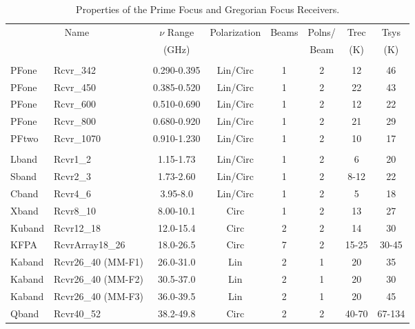 \begin{table}[!h]
\begin{center}
\caption[GBT receiver properties]
{Properties of the Prime Focus and Gregorian Focus Receivers.}
\label{table:gregrx}
\begin{tabular}{llcccccc}
\toprule
\multicolumn{2}{c}{Name} & $\nu$ Range & Polarization & Beams & Polns/& \gls{Trec} & \gls{Tsys} \\
   &                     & (GHz)       &              &       & Beam  &    (K)     &   (K)      \\
\midrule
\addlinespace
\multicolumn{8}{c}{--- Prime Focus Receivers ---}\\
\addlinespace
\gls{PFone} & Rcvr\_342 & 0.290-0.395 &	Lin/Circ &	1 &	2 &	12 &	46 \\
\gls{PFone} & Rcvr\_450 & 0.385-0.520 &	Lin/Circ &	1 &	2 &	22 &	43 \\
\gls{PFone} & Rcvr\_600 & 0.510-0.690 &	Lin/Circ &	1 &	2 &	12 &	22 \\
\gls{PFone} & Rcvr\_800 & 0.680-0.920 &	Lin/Circ &	1 &	2 &	21 &	29 \\
\gls{PFtwo} & Rcvr\_1070& 0.910-1.230 &	Lin/Circ &	1 &	2 &	10 &	17 \\
\addlinespace
\midrule
\addlinespace
\multicolumn{8}{c}{--- Gregorian Focus Receivers ---} \\
\addlinespace
\gls{Lband} & Rcvr1\_2           & 1.15-1.73 & Lin/Circ & 1 & 2 &      6 & 20 \\
\gls{Sband} & Rcvr2\_3           & 1.73-2.60 & Lin/Circ & 1 & 2 &   8-12 & 22 \\
\gls{Cband} & Rcvr4\_6           & 3.95-8.0  & Lin/Circ & 1 & 2 &     5  & 18 \\
\gls{Xband} & Rcvr8\_10          & 8.00-10.1 & Circ     & 1 & 2 &     13 & 27 \\
\gls{Kuband}& Rcvr12\_18         & 12.0-15.4 & Circ     & 2 & 2 &     14 & 30 \\ %
\gls{KFPA}  & RcvrArray18\_26    & 18.0-26.5 & Circ     & 7 & 2 &  15-25 & 30-45 \\
\gls{Kaband}& Rcvr26\_40 (MM-F1) & 26.0-31.0 & Lin      & 2 & 1 &     20 & 35 \\
\gls{Kaband}& Rcvr26\_40 (MM-F2) & 30.5-37.0 & Lin      & 2 & 1 &     20 & 30 \\
\gls{Kaband}& Rcvr26\_40 (MM-F3) & 36.0-39.5 & Lin      & 2 & 1 &     20 & 45 \\
\gls{Qband} & Rcvr40\_52         & 38.2-49.8 & Circ     & 2 & 2 &  40-70 & 67-134 \\ %

\end{tabular}
\end{center}
\end{table}
